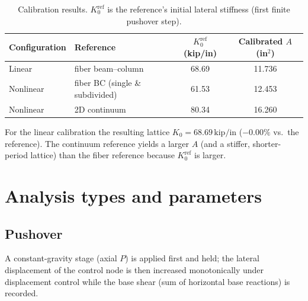 \documentclass[11pt]{article}
\newcommand{\unit}[1]{\,\mathrm{#1}}
\begin{document}
\begin{table}[H]
\centering
\caption{Calibration results. $K_0^{\mathrm{ref}}$ is the reference's initial lateral stiffness
(first finite pushover step).}
\begin{tabular}{l l c c}
\toprule
Configuration & Reference & $K_0^{\mathrm{ref}}$ (kip/in) & Calibrated $A$ (in$^2$) \\
\midrule
Linear            & fiber beam--column            & 68.69 & 11.736 \\
Nonlinear         & fiber BC (single \& subdivided) & 61.53 & 12.453 \\
Nonlinear         & 2D continuum                  & 80.34 & 16.260 \\
\bottomrule
\end{tabular}
\end{table}

For the linear calibration the resulting lattice $K_0 = 68.69\unit{kip/in}$ ($-0.00\%$ vs.\ the
reference). The continuum reference yields a larger $A$ (and a stiffer, shorter-period lattice)
than the fiber reference because $K_0^{\mathrm{ref}}$ is larger.

\section{Analysis types and parameters}

\subsection{Pushover}
\label{sec:proc-pushover}

A constant-gravity stage (axial $P$) is applied first and held; the lateral displacement of the
control node is then increased monotonically under displacement control while the base shear
(sum of horizontal base reactions) is recorded.
\end{document}
